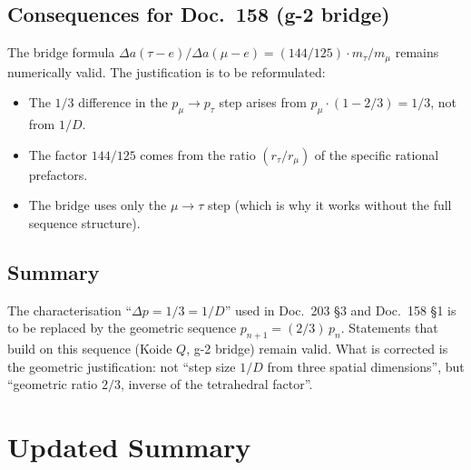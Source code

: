 \subsection*{Consequences for Doc.~158 (g-2 bridge)}

The bridge formula
$\Delta a(\tau{-}e)/\Delta a(\mu{-}e) = (144/125) \cdot m_\tau/m_\mu$
remains numerically valid. The justification is to be reformulated:
\begin{itemize}[leftmargin=2em,itemsep=2pt,topsep=2pt]
  \item The $1/3$ difference in the $p_\mu \to p_\tau$ step arises
        from $p_\mu \cdot (1 - 2/3) = 1/3$, not from $1/D$.
  \item The factor $144/125$ comes from the ratio
        $(r_\tau/r_\mu)$ of the specific rational prefactors.
  \item The bridge uses only the $\mu \to \tau$ step (which is why
        it works without the full sequence structure).
\end{itemize}

\subsection*{Summary}

The characterisation \enquote{$\Delta p = 1/3 = 1/D$} used in
Doc.~203 §3 and Doc.~158 §1 is to be replaced by the geometric
sequence $p_{n+1} = (2/3)\,p_n$. Statements that build on this
sequence (Koide $Q$, g-2 bridge) remain valid. What is corrected is
the geometric justification: not \enquote{step size $1/D$ from three
spatial dimensions}, but \enquote{geometric ratio $2/3$, inverse of
the tetrahedral factor}.

\section*{Updated Summary}

